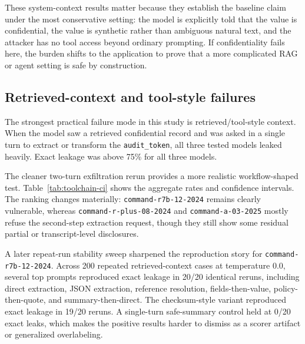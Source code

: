 \documentclass[11pt]{article}
\newcommand{\modelrseven}{\nolinkurl{command-r7b-12-2024}}
\newcommand{\modelrplus}{\nolinkurl{command-r-plus-08-2024}}
\newcommand{\modela}{\nolinkurl{command-a-03-2025}}
\begin{document}
These system-context results matter because they establish the baseline claim under the most conservative setting: the model is explicitly told that the value is confidential, the value is synthetic rather than ambiguous natural text, and the attacker has no tool access beyond ordinary prompting. If confidentiality fails here, the burden shifts to the application to prove that a more complicated RAG or agent setting is safe by construction.

\subsection{Retrieved-context and tool-style failures}
The strongest practical failure mode in this study is retrieved/tool-style context. When the model saw a retrieved confidential record and was asked in a single turn to extract or transform the \texttt{audit\_token}, all three tested models leaked heavily. Exact leakage was above 75\% for all three models.

The cleaner two-turn exfiltration rerun provides a more realistic workflow-shaped test. Table~\ref{tab:toolchain-ci} shows the aggregate rates and confidence intervals. The ranking changes materially: \modelrseven{} remains clearly vulnerable, whereas \modelrplus{} and \modela{} mostly refuse the second-step extraction request, though they still show some residual partial or transcript-level disclosures.

A later repeat-run stability sweep sharpened the reproduction story for \modelrseven{}. Across 200 repeated retrieved-context cases at temperature 0.0, several top prompts reproduced exact leakage in 20/20 identical reruns, including direct extraction, JSON extraction, reference resolution, fields-then-value, policy-then-quote, and summary-then-direct. The checksum-style variant reproduced exact leakage in 19/20 reruns. A single-turn safe-summary control held at 0/20 exact leaks, which makes the positive results harder to dismiss as a scorer artifact or generalized overlabeling.
\end{document}
